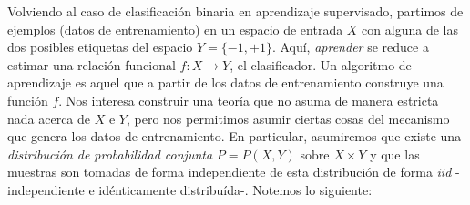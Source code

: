 \documentclass{article}
\begin{document}
Volviendo al caso de clasificación binaria en aprendizaje supervisado, partimos de ejemplos (datos de entrenamiento) 
en un espacio de entrada $X$ con alguna de las dos posibles etiquetas del espacio $Y=\{-1,+1\}$. Aquí, \textit{aprender}
se reduce a estimar una relación funcional $f:X\rightarrow Y$, el clasificador. Un algoritmo de aprendizaje es aquel
que a partir de los datos de entrenamiento construye una función $f$. Nos interesa construir una teoría que no asuma
de manera estricta nada acerca de $X$ e $Y$, pero nos permitimos asumir ciertas cosas del mecanismo que genera los
datos de entrenamiento. En particular, asumiremos que existe una \textit{distribución de probabilidad conjunta} $P=P(X,Y)$
sobre $X\times Y$ y que las muestras son tomadas de forma independiente de esta distribución de forma \textit{iid} -independiente
e idénticamente distribuída-. Notemos lo siguiente:
\end{document}
